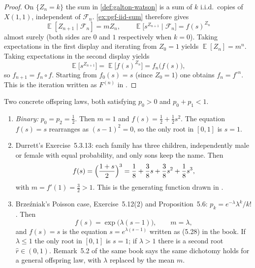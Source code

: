 \documentclass[11pt,a4paper]{article}
\DeclareMathOperator{\E}{\mathbb{E}}
\begin{document}
\begin{proof}
On \(\{Z_n=k\}\) the sum in \cref{def:galton-watson} is a sum of \(k\) i.i.d.\ copies of \(X(1,1)\), independent of \(\mathcal{F}_n\). \cref{ex:pgf-iid-sum} therefore gives
\[
\E[Z_{n+1}\mid\mathcal{F}_n]
=
m Z_n,
\qquad
\E\bigl[s^{Z_{n+1}}\mid\mathcal{F}_n\bigr]
=
f(s)^{Z_n}
\]
almost surely (both sides are \(0\) and \(1\) respectively when \(k=0\)). Taking expectations in the first display and iterating from \(Z_0=1\) yields \(\E[Z_n]=m^n\). Taking expectations in the second display yields
\[
\E\bigl[s^{Z_{n+1}}\bigr]
=
\E\bigl[f(s)^{Z_n}\bigr]
=
f_n\bigl(f(s)\bigr),
\]
so \(f_{n+1}=f_n\circ f\). Starting from \(f_0(s)=s\) (since \(Z_0=1\)) one obtains \(f_n=f^{\circ n}\). This is the iteration written as \(F^{(n)}\) in \citep[(5.34)]{brzezniak1999}.
\end{proof}

\begin{example}
\label{ex:gw-binomial}
Two concrete offspring laws, both satisfying \(p_0>0\) and \(p_0+p_1<1\).
\begin{enumerate}[label=\textup{(\arabic*)}]
    \item
    \emph{Binary:} \(p_0=p_2=\tfrac12\). Then \(m=1\) and \(f(s)=\tfrac12+\tfrac12 s^2\). The equation \(f(s)=s\) rearranges as \((s-1)^2=0\), so the only root in \([0,1]\) is \(s=1\).
    \item
    Durrett's Exercise~5.3.13: each family has three children, independently male or female with equal probability, and only sons keep the name. Then
    \[
    f(s)
    =
    \Bigl(\frac{1+s}{2}\Bigr)^3
    =
    \frac18+\frac38 s+\frac38 s^2+\frac18 s^3,
    \]
    with \(m=f'(1)=\tfrac32>1\). This is the generating function drawn in \citep[Figure~5.3]{durrett2010}.
    \item
    Brzeźniak's Poisson case, Exercise~5.12(2) and Proposition~5.6: \(p_k=e^{-\lambda}\lambda^k/k!\). Then
    \[
    f(s)
    =
    \exp\bigl(\lambda(s-1)\bigr),
    \qquad
    m=\lambda,
    \]
    and \(f(s)=s\) is the equation \(s=e^{\lambda(s-1)}\) written as (5.28) in the book. If \(\lambda\le 1\) the only root in \([0,1]\) is \(s=1\); if \(\lambda>1\) there is a second root \(\hat r\in(0,1)\). Remark~5.2 of the same book says the same dichotomy holds for a general offspring law, with \(\lambda\) replaced by the mean \(m\).
\end{enumerate}
\end{example}
\end{document}
